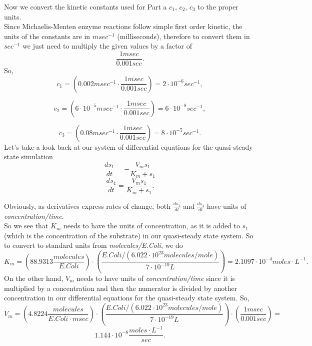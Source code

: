 Now we convert the kinetic constants used for Part a $c_{1}$, $c_{2}$, $c_{3}$ to the proper units.\\
Since Michaelis-Menten enzyme reactions follow simple first order kinetic, the units of the constants are in $msec^{-1}$ (milliseconds), therefore to convert them in $sec^{-1}$ we just need to multiply the given values by a factor of
$$
\frac{1 msec}{0.001 sec}.
$$
So,
$$
c_{1} = \left(0.002 msec^{-1} \cdot \frac{1 msec}{0.001 sec} \right)= 2 \cdot 10^{-6} sec^{-1},
$$

$$
c_{2} = \left(6 \cdot 10^{-5} msec^{-1} \cdot \frac{1 msec}{0.001 sec}\right) = 6 \cdot 10^{-8} sec^{-1},
$$

$$
c_{3} = \left(0.08 msec^{-1} \cdot \frac{1 msec}{0.001 sec}\right) =  8 \cdot 10^{-5} sec^{-1}.
$$
Let's take a look back at our system of differential equations for the quasi-steady state simulation
$$
\frac{ds_{1}}{dt} = - \frac{V_{m}s_{1}}{K_{m}+s_{1}}
$$
$$
\frac{ds_{4}}{dt} = \frac{V_{m}s_{1}}{K_{m}+s_{1}}.
$$

Obviously, as derivatives express rates of change, both $\frac{ds_{1}}{dt}$ and $\frac{ds_{4}}{dt}$ have units of \textit{concentration/time}.\\
So we see that $K_{m}$ needs to have the units of concentration, as it is added to $s_{1}$ (which is the concentration of the substrate) in our quasi-steady state system. So to convert to standard units from \textit{molecules/E.Coli}, we do
$$
K_{m} = \left(88.9313 \frac{molecules}{E.Coli}\right) \cdot  \left(\frac{E.Coli/(6.022\cdot 10^{23} molecules/mole)}{7 \cdot 10^{-19}L}\right) = 2.1097 \cdot 10^{-4} moles \cdot L^{-1}.
$$
On the other hand, $V_{m}$ needs to have units of \textit{concentration/time} since it is multiplied by a concentration and then the numerator is divided by another concentration in our differential equations for the quasi-steady state system. So, 
$$
V_{m} = \left(4.8224 \frac{molecules}{E.Coli \cdot msec}\right) \cdot  \left(\frac{E.Coli/(6.022\cdot 10^{23} molecules/mole)}{7 \cdot 10^{-19}L}\right) \cdot \left(\frac{1 msec}{0.001 sec}\right)  = 
$$
$$
1.144 \cdot 10^{-8} \frac{moles \cdot L^{-1}}{sec}.
$$
